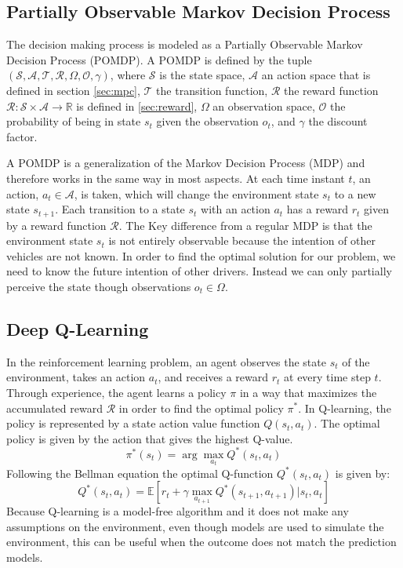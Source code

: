 \subsection{Partially Observable Markov Decision Process}\label{sec:pomdp}
The decision making process is modeled as a Partially Observable Markov Decision Process (POMDP). A POMDP is defined by the  tuple $(\mathcal{S},\mathcal{A},\mathcal{T},\mathcal{R},\Omega ,\mathcal{O},\gamma)$, where $\mathcal{S}$ is the state space, $\mathcal{A}$ an action space that is defined in section \ref{sec:mpc}, $\mathcal{T}$ the transition function, %
$\mathcal{R}$ the reward function $\mathcal{R}: \mathcal{S} \times \mathcal{A} \to \mathbb{R}$ is defined in \ref{sec:reward}, $\Omega$ an observation space, $\mathcal{O}$ the probability of being in state $s_{t}$ given the observation $o_t$, and $\gamma$ the discount factor.

A POMDP is a generalization of the Markov Decision Process (MDP) \cite{BellmanMDP} and therefore works in the same way in most aspects. At each time instant $t$, an action, $a_t\in \mathcal{A}$, is taken, which will change the environment state $s_t$ to a new state $s_{t+1}$. Each transition to a state $s_t$ with an action $a_t$ has a reward $r_t$ given by a reward function $\mathcal{R} $. The Key difference from a regular MDP is that the environment state $s_t$ is not entirely observable because the intention of other vehicles are not known. In order to find the optimal solution for our problem, we need to know the future intention of other drivers. Instead we can only partially perceive the state though observations $o_t\in \Omega$.

\subsection{Deep Q-Learning}
In the reinforcement learning problem, an agent observes the state $s_t$ of the environment, takes an action $a_t$, and receives a reward $r_t$ at every time step $t$. Through experience, the agent learns a policy $\pi$ in a way that maximizes the accumulated reward $\mathcal{R}$ in order to find the optimal policy $\pi^*$. In Q-learning, the policy is represented by a state action value function $Q(s_t,a_t)$. The optimal policy is given by the action that gives the highest Q-value. 
\begin{equation}
\pi^*(s_t) = \arg\max_{a_t} Q^*(s_t,a_t)
\label{eq:optimal_policy}
\end{equation}
Following the Bellman equation the optimal Q-function $Q^*(s_t,a_t)$ is given by:
 \begin{equation}
 Q^*(s_t,a_t)= \mathbb{E}[r_t + \gamma \max_{a_{t+1}} Q^*(s_{t+1}, a_{t+1})| s_t, a_t]
 \label{eq:q-function}
 \end{equation}
Because Q-learning is a model-free algorithm and it does not make any assumptions on the environment, even though models are used to simulate the environment, this can be useful when the outcome does not match the prediction models. 

